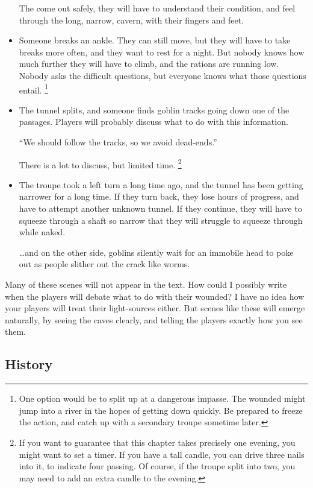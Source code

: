 \begin{multicols}{2}
\begin{itemize}
	The come out safely, they will have to understand their condition, and feel through the long, narrow, cavern, with their fingers and feet.
	\item
	Someone breaks an ankle.
	They can still move, but they will have to take breaks more often, and they want to rest for a night.
	But nobody knows how much further they will have to climb, and the rations are running low.
	Nobody asks the difficult questions, but everyone knows what those questions entail.%
	\footnote{One option would be to split up at a dangerous impasse.
	The wounded might jump into a river in the hopes of getting down quickly.
	Be prepared to freeze the action, and catch up with a secondary troupe sometime later.}
	\item
	The tunnel splits, and someone finds goblin tracks going down one of the passages.
	Players will probably discuss what to do with this information.
	\begin{speechtext}
		``We should follow the tracks, so we avoid dead-ends.''
	\end{speechtext}
	There is a lot to discuss, but limited time.%
	\footnote{If you want to guarantee that this chapter takes precisely one evening, you might want to set a timer.
	If you have a tall candle, you can drive three nails into it, to indicate four  passing.
	Of course, if the troupe split into two, you may need to add an extra candle to the evening.}
	\item
	The troupe took a left turn a long time ago, and the tunnel has been getting narrower for a long time.
	If they turn back, they lose hours of progress, and have to attempt another unknown tunnel.
	If they continue, they will have to squeeze through a shaft so narrow that they will struggle to squeeze through while naked.

	\ldots and on the other side, goblins silently wait for an immobile head to poke out as people slither out the crack like worms.
\end{itemize}

Many of these scenes will not appear in the text.
How could I possibly write when the players will debate what to do with their wounded?
I have no idea how your players will treat their light-sources either.
But scenes like these will emerge naturally, by seeing the caves clearly, and telling the players exactly how you see them.

\subsection{History}
\label{caves_history}


\end{multicols}
